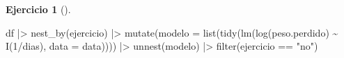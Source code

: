 \documentclass[
  a4paper,
]{scrreport}
\newenvironment{Shaded}{\begin{snugshade}}{\end{snugshade}}
\newcommand{\AttributeTok}[1]{\textcolor[rgb]{0.40,0.45,0.13}{#1}}
\newcommand{\DecValTok}[1]{\textcolor[rgb]{0.68,0.00,0.00}{#1}}
\newcommand{\FunctionTok}[1]{\textcolor[rgb]{0.28,0.35,0.67}{#1}}
\newcommand{\NormalTok}[1]{\textcolor[rgb]{0.00,0.23,0.31}{#1}}
\newcommand{\SpecialCharTok}[1]{\textcolor[rgb]{0.37,0.37,0.37}{#1}}
\newcommand{\StringTok}[1]{\textcolor[rgb]{0.13,0.47,0.30}{#1}}
\theoremstyle{definition}
\newtheorem{exercise}{Ejercicio}[chapter]
\theoremstyle{remark}
\begin{document}
\begin{exercise}[]
\begin{enumerate}
\begin{tcolorbox}
\begin{Shaded}
\begin{Highlighting}[]
\NormalTok{df }\SpecialCharTok{|\textgreater{}}
    \FunctionTok{nest\_by}\NormalTok{(ejercicio) }\SpecialCharTok{|\textgreater{}} 
    \FunctionTok{mutate}\NormalTok{(}\AttributeTok{modelo =} \FunctionTok{list}\NormalTok{(}\FunctionTok{tidy}\NormalTok{(}\FunctionTok{lm}\NormalTok{(}\FunctionTok{log}\NormalTok{(peso.perdido) }\SpecialCharTok{\textasciitilde{}} \FunctionTok{I}\NormalTok{(}\DecValTok{1}\SpecialCharTok{/}\NormalTok{dias), }\AttributeTok{data =}\NormalTok{ data)))) }\SpecialCharTok{|\textgreater{}} 
    \FunctionTok{unnest}\NormalTok{(modelo) }\SpecialCharTok{|\textgreater{}}
    \FunctionTok{filter}\NormalTok{(ejercicio }\SpecialCharTok{==} \StringTok{"no"}\NormalTok{)}
\end{Highlighting}
\end{Shaded}


\end{tcolorbox}
\end{enumerate}
\end{exercise}
\end{document}
